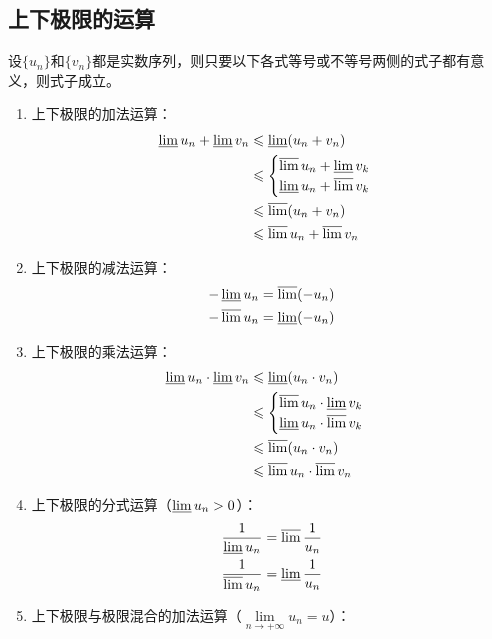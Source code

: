 \subsection{上下极限的运算}
\begin{theorem}
	设$\{u_n\}$和$\{v_n\}$都是实数序列，则只要以下各式等号或不等号两侧的式子都有意义，则式子成立。
	\begin{enumerate}
		\item 上下极限的加法运算：
		\begin{align*}
			\varliminf u_n+\varliminf v_n &\leqslant\varliminf(u_n+v_n) \\
			&\leqslant
			\begin{cases}
				\varlimsup u_n+\varliminf v_k \\
				\varliminf u_n+\varlimsup v_k
			\end{cases} \\
			&\leqslant\varlimsup(u_n+v_n) \\
			&\leqslant\varlimsup u_n+\varlimsup v_n
		\end{align*}
		\item 上下极限的减法运算：
		\begin{gather*}
			-\varliminf u_n=\varlimsup(-u_n) \\
			-\varlimsup u_n=\varliminf(-u_n)
		\end{gather*}
		\item 上下极限的乘法运算：
		\begin{align*}
			\varliminf u_n\cdot\varliminf v_n &\leqslant\varliminf(u_n\cdot v_n) \\
			&\leqslant
			\begin{cases}
				\varlimsup u_n\cdot\varliminf v_k \\
				\varliminf u_n\cdot\varlimsup v_k
			\end{cases} \\
			&\leqslant\varlimsup(u_n\cdot v_n) \\
			&\leqslant\varlimsup u_n\cdot\varlimsup v_n
		\end{align*}
		\item 上下极限的分式运算（$\varliminf u_n>0$）：
		\begin{gather*}
			\frac{1}{\varliminf u_n}=\varlimsup\frac{1}{u_n} \\
			\frac{1}{\varlimsup u_n}=\varliminf\frac{1}{u_n}
		\end{gather*}
		\item 上下极限与极限混合的加法运算（$\lim\limits_{n\to+\infty}u_n=u$）：
		\begin{gather*}

\end{gather*}
\end{enumerate}
\end{theorem}
